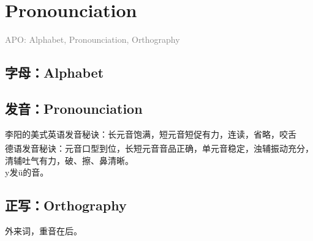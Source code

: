 \chapter{Pronounciation}
\label{chap:pronounciation}

\textcolor{gray}{APO: Alphabet, Pronounciation, Orthography}
\section{字母：Alphabet}
\section{发音：Pronounciation}
李阳的美式英语发音秘诀：长元音饱满，短元音短促有力，连读，省略，咬舌 \\
德语发音秘诀\textsuperscript{\cite{deutschphonetik2023}}：元音口型到位，长短元音音品正确，单元音稳定，浊辅振动充分，清辅吐气有力，破、擦、鼻清晰。 \\
y发ü的音。
\section{正写：Orthography}
外来词，重音在后。
